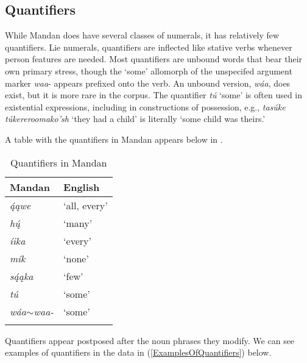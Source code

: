 \subsection{Quantifiers}\label{SubSecQuantifiers}

While Mandan does have several classes of numerals, it has relatively few quantifiers. Lie numerals, quantifiers are inflected like stative verbs whenever person features are needed. Most quantifiers are unbound words that bear their own primary stress, though the `some' allomorph of the unspecifed argument marker \textit{waa}- appears prefixed onto the verb. An unbound version, \textit{wáa}, does exist, but it is more rare in the corpus. The quantifier \textit{tú} `some' is often used in existential expressions, including in constructions of possession, e.g., \textit{tasúke túkereroomako'sh} `they had a child' is literally `some child was theirs.'

A table with the quantifiers in Mandan appears below in .

\begin{table}
        \caption{Quantifiers in Mandan}\label{TableQuantifiers}
    \begin{tabular}{ll}
\lsptoprule
    \textbf{Mandan}&\textbf{English}\\
\midrule
    \textit{ą́ąwe}&`all, every'\\
    \textit{hų́}&`many'\\
    \textit{íika}&`every'\\
    \textit{mík}&`none'\\
    \textit{są́ąka}&`few'\\
    \textit{tú}&`some'\\
    \textit{wáa$\sim$waa-}&`some'\\
    \lspbottomrule
    \end{tabular}

\end{table}

Quantifiers appear postposed after the noun phrases they modify. We can see examples of quantifiers in the data in (\ref{ExamplesOfQuantifiers}) below.

\newpage


